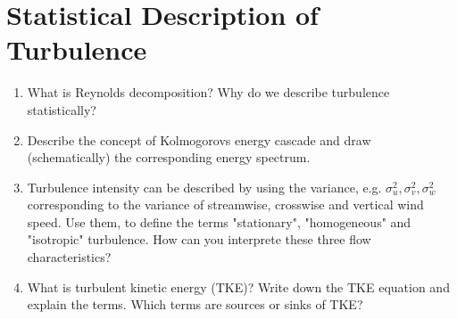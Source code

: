 \documentclass{article}
\begin{document}
\section{Statistical Description of Turbulence}
\begin{enumerate}[label=(\alph*)]
    \item What is Reynolds decomposition? Why do we describe turbulence statistically? %
    \item Describe the concept of Kolmogorovs energy cascade and draw (schematically) the corresponding energy spectrum. %
    \item Turbulence intensity can be described by using the variance, e.g. $\sigma_u^2,\sigma_v^2,\sigma_w^2$ corresponding to the variance of streamwise, crosswise and vertical wind speed. Use them, to define the terms "stationary", "homogeneous" and "isotropic" turbulence. How can you interprete these three flow characteristics? 
    \item What is turbulent kinetic energy (TKE)? Write down the TKE equation and explain the terms. Which terms are sources or sinks of TKE? %
\end{enumerate}
\end{document}
